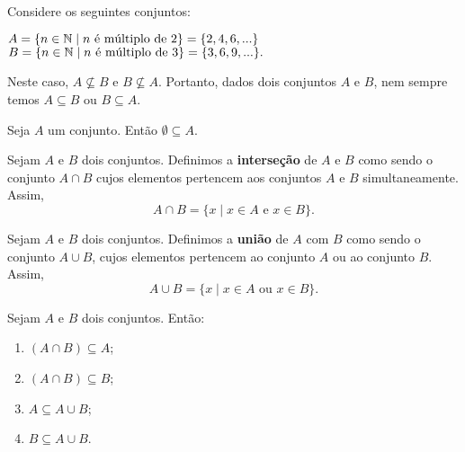 \documentclass{beamer}
\begin{document}
    \begin{frame}
        Considere os seguintes conjuntos:\pause
        \begin{center}
            $A = \{ n \in \mathbb{N} \mid n \mbox{ {\'e} m{\'u}ltiplo de } 2\} = \{2,4,6,...\}$\pause\\
            $B = \{n \in \mathbb{N} \mid n \mbox{ {\'e} m{\'u}ltiplo de } 3\} = \{3,6,9,...\}.$\pause
        \end{center}

        Neste caso, $A \nsubseteq B$ \pause e $B \nsubseteq A$. \pause Portanto, dados dois conjuntos $A$ e $B$, nem sempre
        temos $A \subseteq B$ \pause ou $B \subseteq A$.\pause

        \begin{proposicao}
            Seja $A$ um conjunto. \pause Ent{\~a}o $ \emptyset \subseteq A$.
        \end{proposicao}
    \end{frame}

        \begin{frame}
        \begin{definicao}
            Sejam $A$ e $B$ dois conjuntos. \pause Definimos a \textbf{interse{\c c}{\~a}o} de $A$ e $B$ \pause como sendo o conjunto $A \cap B$ \pause cujos elementos pertencem aos conjuntos $A$ e $B$ simultaneamente. \pause Assim,
            \[
                A \cap B = \{x \mid x \in A\mbox{ e }  x \in B\}.
            \]
        \end{definicao}

    \end{frame}

    \begin{frame}
        \begin{definicao}
            Sejam $A$ e $B$ dois conjuntos. \pause Definimos a \textbf{uni{\~a}o} de $A$ com $B$ \pause como sendo o conjunto $A \cup B$, \pause cujos elementos pertencem ao conjunto $A$ ou ao conjunto $B$. \pause Assim,\pause
            \[
                A \cup B = \{x \mid x \in A \mbox{ ou } x \in B\}.
            \]
        \end{definicao}
    \end{frame}

    \begin{frame}
        \begin{proposicao} Sejam $A$ e $B$ dois conjuntos. \pause Ent{\~a}o:\pause
            \begin{enumerate}[label={\roman*})]
                \item $(A \cap B) \subseteq A$;\pause
                \item $(A \cap B) \subseteq B$;\pause
                \item $A \subseteq A \cup B$;\pause
                \item $B \subseteq A \cup B$.
            \end{enumerate}
        \end{proposicao}
    \end{frame}
\end{document}
